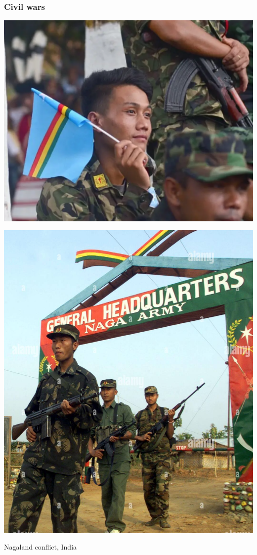\documentclass[aspectratio=43]{beamer}
\begin{document}
\begin{frame}
\frametitle{Civil wars}
\centering

\begin{minipage}{0.49\textwidth}\centering
\includegraphics[width = \textwidth]{img/naga1}
\end{minipage}\hfill
\begin{minipage}{0.49\textwidth}\centering
\includegraphics[width = \textwidth]{img/naga2}
\end{minipage}

Nagaland conflict, India

\end{frame}
\end{document}
